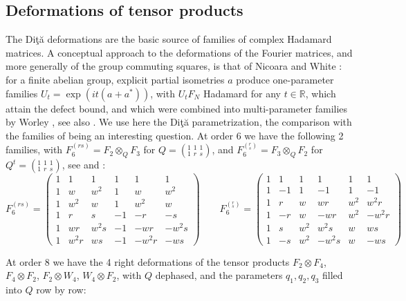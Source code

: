 \documentclass[11pt]{amsart}
\begin{document}
\subsection{Deformations of tensor products}\label{sec:dita}

The Di\c t\u a deformations are the basic source of families of complex Hadamard matrices. A conceptual approach to the deformations of the Fourier matrices, and more generally of the group commuting squares, is that of Nicoara and White \cite{nwh}: for a finite abelian group, explicit partial isometries $a$ produce one-parameter families $U_t=\exp(it(a+a^*))$, with $U_tF_N$ Hadamard for any $t\in\mathbb R$, which attain the defect bound, and which were combined into multi-parameter families by Worley \cite{wor}, see also \cite{nw4}. We use here the Di\c t\u a parametrization, the comparison with the families of \cite{nwh,wor} being an interesting question. At order 6 we have the following 2 families, with $F_6^{(rs)}=F_2\otimes_QF_3$ for $Q=(^1_1{\ }^1_r{\ }^1_s)$, and $F_6^{(^r_s)}=F_3\otimes_QF_2$ for $Q^t=(^1_1{\ }^1_r{\ }^1_s)$, see \cite[Proposition 6.19]{banicaHM} and \cite{bbs}:
$$F_6^{(rs)}=\begin{pmatrix}
1&1&1&1&1&1\\
1&w&w^2&1&w&w^2\\
1&w^2&w&1&w^2&w\\
1&r&s&-1&-r&-s\\
1&wr&w^2s&-1&-wr&-w^2s\\
1&w^2r&ws&-1&-w^2r&-ws
\end{pmatrix}\qquad
F_6^{(^r_s)}=\begin{pmatrix}
1&1&1&1&1&1\\
1&-1&1&-1&1&-1\\
1&r&w&wr&w^2&w^2r\\
1&-r&w&-wr&w^2&-w^2r\\
1&s&w^2&w^2s&w&ws\\
1&-s&w^2&-w^2s&w&-ws
\end{pmatrix}$$

\noindent At order 8 we have the 4 right deformations of the tensor products $F_2\otimes F_4$, $F_4\otimes F_2$, $F_2\otimes W_4$, $W_4\otimes F_2$, with $Q$ dephased, and the parameters $q_1,q_2,q_3$ filled into $Q$ row by row:
\end{document}
